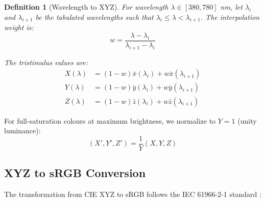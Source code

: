 \documentclass[12pt,a4paper]{article}
\newtheorem{definition}[theorem]{Definition}
\newcommand{\wavelength}{\lambda}
\begin{document}
\begin{definition}[Wavelength to XYZ]
For wavelength $\wavelength \in [380, 780]$ nm, let $\wavelength_i$ and $\wavelength_{i+1}$ be the tabulated wavelengths such that $\wavelength_i \leq \wavelength < \wavelength_{i+1}$. The interpolation weight is:
\begin{equation}
w = \frac{\wavelength - \wavelength_i}{\wavelength_{i+1} - \wavelength_i}
\end{equation}

The tristimulus values are:
\begin{align}
X(\wavelength) &= (1-w) \bar{x}(\wavelength_i) + w \bar{x}(\wavelength_{i+1}) \\
Y(\wavelength) &= (1-w) \bar{y}(\wavelength_i) + w \bar{y}(\wavelength_{i+1}) \\
Z(\wavelength) &= (1-w) \bar{z}(\wavelength_i) + w \bar{z}(\wavelength_{i+1})
\end{align}
\end{definition}

For full-saturation colours at maximum brightness, we normalize to $Y = 1$ (unity luminance):
\begin{equation}
(X', Y', Z') = \frac{1}{Y}(X, Y, Z)
\end{equation}

\subsection{XYZ to sRGB Conversion}

The transformation from CIE XYZ to sRGB follows the IEC 61966-2-1 standard \cite{stokes1996srgb}:
\end{document}
